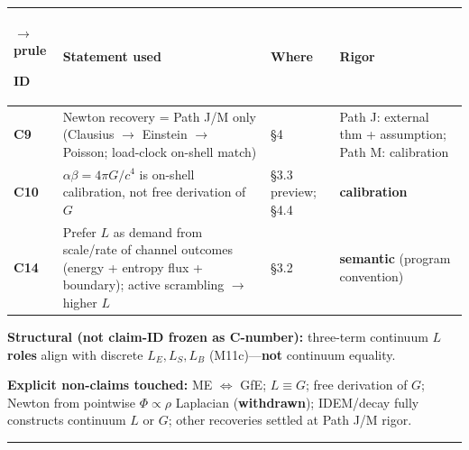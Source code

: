 \documentclass[
  11pt,
]{article}
\newcounter{none} %
\begin{document}
{\def\LTcaptype{none} %
\begin{longtable}[]{@{}
  >{\raggedright\arraybackslash}p{}
  >{\raggedright\arraybackslash}p{}
  >{\raggedright\arraybackslash}p{}
  >{\raggedright\arraybackslash}p{}@{}}
$\rightarrow$prule\noalign{}
\begin{minipage}[b]{\linewidth}\raggedright
ID
\end{minipage} & \begin{minipage}[b]{\linewidth}\raggedright
Statement used
\end{minipage} & \begin{minipage}[b]{\linewidth}\raggedright
Where
\end{minipage} & \begin{minipage}[b]{\linewidth}\raggedright
Rigor
\end{minipage} \\
\midrule\noalign{}
\endhead
\bottomrule\noalign{}
\endlastfoot
\textbf{C9} & Newton recovery = Path J/M only (Clausius $\rightarrow$ Einstein $\rightarrow$ Poisson; load-clock on-shell match) & \S4 & Path J: external thm + assumption; Path M: calibration \\
\textbf{C10} & \(\alpha\beta=4\pi G/c^4\) is on-shell calibration, not free derivation of \(G\) & \S3.3 preview; \S4.4 & \textbf{calibration} \\
\textbf{C14} & Prefer \(L\) as demand from scale/rate of channel outcomes (energy + entropy flux + boundary); active scrambling $\rightarrow$ higher \(L\) & \S3.2 & \textbf{semantic} (program convention) \\
\end{longtable}
}

\textbf{Structural (not claim-ID frozen as C-number):} three-term continuum \(L\) \textbf{roles} align with discrete \(L_E,L_S,L_B\) (M11c)---\textbf{not} continuum equality.

\textbf{Explicit non-claims touched:} ME \(\Leftrightarrow\) GfE; \(L\equiv G\); free derivation of \(G\); Newton from pointwise \(\Phi\propto\rho\) Laplacian (\textbf{withdrawn}); IDEM/decay fully constructs continuum \(L\) or \(G\); other recoveries settled at Path J/M rigor.

\begin{center}\rule{0.5\linewidth}{0.5pt}\end{center}
\end{document}
